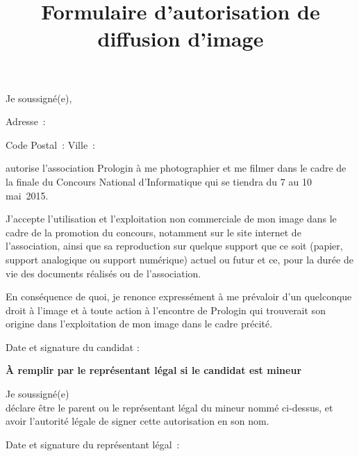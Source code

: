\documentclass[a4paper,11pt]{prologin}
\title{Formulaire d'autorisation de diffusion d'image}
\begin{document}
Je soussigné(e), \dotfill

Adresse~:\dotfill

Code Postal~: \dotfill  Ville~: \dotfill

autorise l'association Prologin à me photographier et me filmer dans
le cadre de la finale du Concours National d'Informatique qui se tiendra du 7 au 10 mai~2015.

J'accepte l'utilisation et l'exploitation non commerciale de mon
image dans le cadre de la promotion du concours, notamment sur le site internet
de l'association, ainsi que sa reproduction sur quelque support que ce soit
(papier, support analogique ou support numérique) actuel ou futur et ce, pour la
durée de vie des documents réalisés ou de l'association.

En conséquence de quoi, je renonce expressément à me prévaloir d'un
quelconque droit à l'image et à toute action à l'encontre de Prologin qui
trouverait son origine dans l'exploitation de mon image dans le cadre précité.

Date et signature du candidat :\vspace\baselineskip

\textbf{À remplir par le représentant légal si le candidat est mineur}

Je soussigné(e) \dotfill\\
déclare être le parent ou le représentant légal du mineur nommé
ci-dessus, et avoir l'autorité légale de signer cette autorisation en son nom.

Date et signature du représentant légal~:
\end{document}
